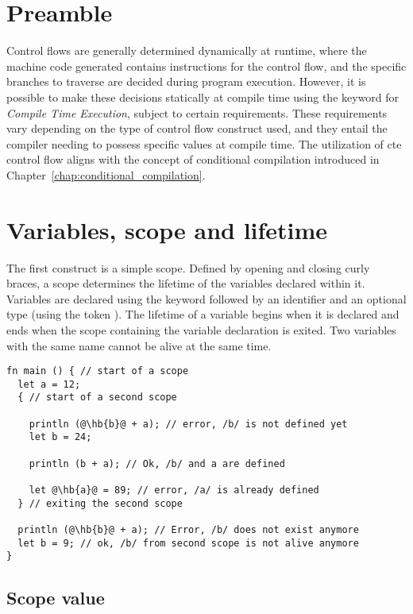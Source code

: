 \section{Preamble}

Control flows are generally determined dynamically at runtime, where the machine
code generated contains instructions for the control flow, and the specific
branches to traverse are decided during program execution. However, it is
possible to make these decisions statically at compile time using the keyword
 for \textit{Compile Time Execution}, subject to certain
requirements. These requirements vary depending on the type of control flow
construct used, and they entail the compiler needing to possess specific values
at compile time. The utilization of cte control flow aligns with the concept of
conditional compilation introduced in
Chapter~\ref{chap:conditional_compilation}.


\section{Variables, scope and lifetime}
\label{sec:variable_lifetime}

The first construct is a simple scope. Defined by opening and closing curly
braces, a scope determines the lifetime of the variables declared within it.
Variables are declared using the keyword  followed by an identifier
and an optional type (using the token \token{:}). The lifetime of a variable
begins when it is declared and ends when the scope containing the variable
declaration is exited. Two variables with the same name cannot be alive at the
same time.

\begin{lstlisting}[style=coloredverbatim, escapechar=@]
fn main () { // start of a scope
  let a = 12;
  { // start of a second scope

    println (@\hb{b}@ + a); // error, /b/ is not defined yet
    let b = 24;

    println (b + a); // Ok, /b/ and a are defined

    let @\hb{a}@ = 89; // error, /a/ is already defined
  } // exiting the second scope

  println (@\hb{b}@ + a); // Error, /b/ does not exist anymore
  let b = 9; // ok, /b/ from second scope is not alive anymore
}
\end{lstlisting}

\subsection{Scope value}


